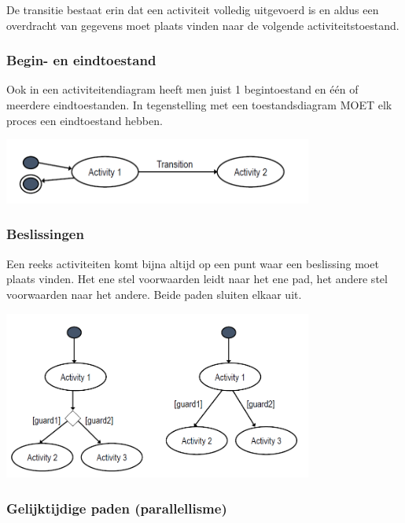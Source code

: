 De transitie bestaat erin dat een activiteit volledig uitgevoerd is en aldus een overdracht van gegevens moet plaats vinden naar de volgende activiteitstoestand.

\subsubsection{Begin- en eindtoestand}

Ook in een activiteitendiagram heeft men juist 1 begintoestand en één of meerdere eindtoestanden. In tegenstelling met een toestandsdiagram MOET elk proces een eindtoestand hebben.


\begin{center}
\includegraphics[width=4in]{img/activity2}%
\end{center}
\newpage
\subsubsection{Beslissingen}

Een reeks activiteiten komt bijna altijd op een punt waar een beslissing moet plaats vinden. Het ene stel voorwaarden leidt naar het ene pad, het andere stel voorwaarden naar het andere. Beide paden sluiten elkaar uit.


\begin{center}
\includegraphics[width=4in]{img/decision3}%
\end{center}

\subsubsection{Gelijktijdige paden (parallellisme)}

